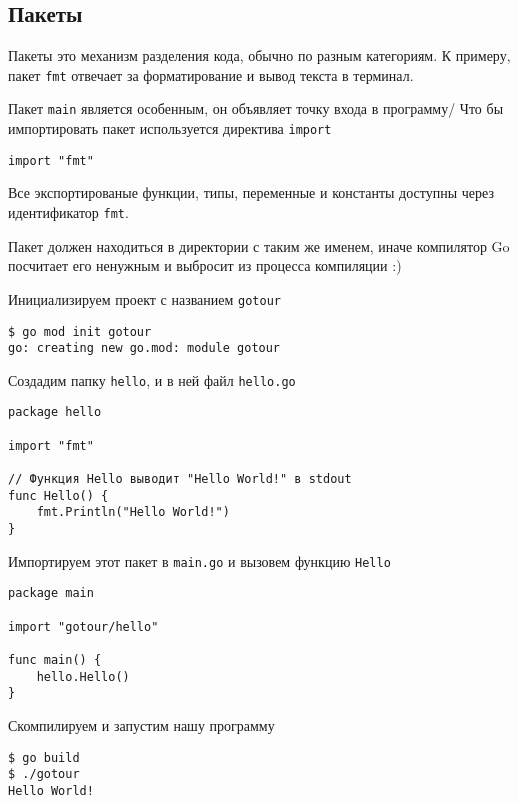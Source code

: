 \subsection{Пакеты}
Пакеты это механизм разделения кода, обычно по разным категориям.
К примеру, пакет \verb|fmt| отвечает за форматирование и вывод текста в терминал.

Пакет \verb|main| является особенным, он объявляет точку входа в программу/
Что бы импортировать пакет используется директива \verb|import|
\begin{verbatim}
import "fmt"
\end{verbatim}
Все экспортированые функции, типы, переменные и константы доступны через идентификатор \verb|fmt|.

Пакет должен находиться в директории с таким же именем, иначе компилятор Go посчитает его ненужным и выбросит из процесса компиляции :)

Инициализируем проект с названием \verb|gotour|
\begin{verbatim}
$ go mod init gotour
go: creating new go.mod: module gotour
\end{verbatim}

Создадим папку \verb|hello|, и в ней файл \verb|hello.go|
\begin{verbatim}
package hello

import "fmt"

// Функция Hello выводит "Hello World!" в stdout
func Hello() {
    fmt.Println("Hello World!")
}
\end{verbatim}

Импортируем этот пакет в \verb|main.go| и вызовем функцию \verb|Hello|
\begin{verbatim}
package main

import "gotour/hello"

func main() {
    hello.Hello()
}
\end{verbatim}

Скомпилируем и запустим нашу программу
\begin{verbatim}
$ go build
$ ./gotour
Hello World!
\end{verbatim}
